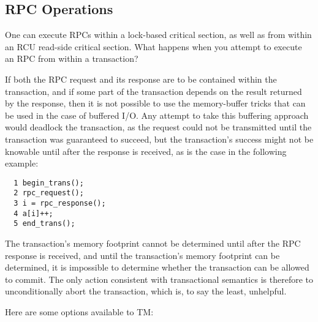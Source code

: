 \subsection{RPC Operations}
\label{sec:future:RPC Operations}

One can execute RPCs within a lock-based critical section, as well as
from within an RCU read-side critical section. What happens when you
attempt to execute an RPC from within a transaction?

If both the RPC request and its response are to be contained within the
transaction, and if some part of the transaction depends on the result
returned by the response, then it is not possible to use the memory-buffer
tricks that can be used in the case of buffered I/O.
Any attempt to
take this buffering approach would deadlock the transaction, as the
request could not be transmitted until the transaction was guaranteed
to succeed, but the transaction's success might not be knowable until
after the response is received, as is the case in the following example:

\vspace{5pt}
\begin{minipage}[t]{\columnwidth}
\small
\begin{verbatim}
  1 begin_trans();
  2 rpc_request();
  3 i = rpc_response();
  4 a[i]++;
  5 end_trans();
\end{verbatim}
\end{minipage}
\vspace{5pt}

The transaction's memory footprint cannot be determined until after the
RPC response is received, and until the transaction's memory footprint
can be determined, it is impossible to determine whether the transaction
can be allowed to commit.
The only action consistent with transactional semantics is therefore to
unconditionally abort the transaction, which is, to say the least,
unhelpful.

Here are some options available to TM:

